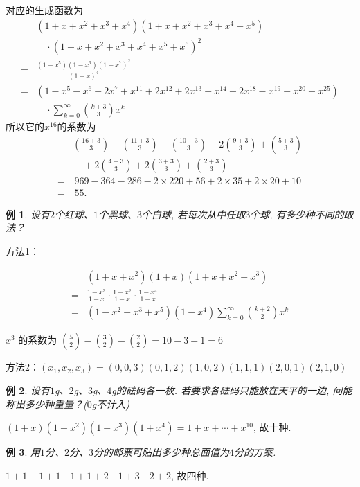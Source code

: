 \documentclass[punct]{ctexbeamer}
\newtheorem{ex}{例}[section]
\def\sol{\noindent {\bf 解\ }}
\begin{document}
\begin{frame}
	对应的生成函数为
	$$
	\begin{aligned}
	&(1+x+x^2+x^3+x^4)
	(1+x+x^2+x^3+x^4+x^5)\\
	&\quad\cdot 	(1+x+x^2+x^3+x^4+x^5+x^6)^2\\
	= & \frac{(1-x^5)(1-x^6)(1-x^7)^2}{(1-x)^4}\\
	= &
	(1 - x^5 - x^6 - 2 x^7 + x^{11} + 2 x^{12} + 2 x^{13} + x^{14} -
	2 x^{18} - x^{19} - x^{20} + x^{25})\\
	&\quad\cdot \sum_{k=0}^{\infty} \binom{k+3}{3} x^k
	\end{aligned}$$
	所以它的$x^{16}$的系数为
	$$
	\begin{aligned}
	& \binom{16+3}{3}
	-\binom{11+3}{3}
	-\binom{10+3}{3}
	-2\binom{9+3}{3}
	+ \binom{5+3}{3}\\
	&\quad
	+2\binom{4+3}{3}
	+2\binom{3+3}{3}
	+\binom{2+3}{3} \\
	= & \,969 -  364 - 286 -2 \times 220 + 56  +2 \times 35 +2 \times 20 + 10 \\
	= & \,55.
	\end{aligned}$$
\end{frame}

\begin{frame}
	\begin{ex}
		设有$2$个红球、$1$个黑球、$3$个白球, 若每次从中任取$3$个球, 有多少种不同的取法？
	\end{ex}
\pause\sol
方法1：

$$\begin{aligned}&\left(1+x+x^{2}\right)(1+x)\left(1+x+x^{2}+x^{3}\right)\\
 =&\frac{1-x^{3}}{1-x} \cdot \frac{1-x^{2}}{1-x} \cdot \frac{1-x^{4}}{1-x} \\ =&\left(1-x^{2}-x^{3}+x^{5}\right)\left(1-x^{4}\right) \sum_{k=0}^{\infty}\binom{k+2}{2} x^{k} \end{aligned}$$

$x^{3}$ 的系数为 $\binom{5}{2}-\binom{3}{2}-\binom{2}{2}=10-3-1=6$

方法2：$\left(x_{1}, x_{2}, x_{3}\right)=(0,0,3)(0, 1, 2)(1,0,2)(1,1,1)(2,0,1)(2,1,0)$
\end{frame}

\begin{frame}
	\begin{ex}
		设有$1$g、$2$g、$3$g、$4$g的砝码各一枚. 若要求各砝码只能放在天平的一边, 问能称出多少种重量？($0$g不计入)
	\end{ex}
\pause\sol $(1+x)\left(1+x^{2}\right)\left(1+x^{3}\right)\left(1+x^{4}\right)=1+x+\cdots+x^{10}$, 故十种.
\pause
\begin{ex}
	用$1$分、$2$分、$3$分的邮票可贴出多少种总面值为$4$分的方案.
\end{ex}
\pause
\sol $1+1+1+1 \quad 1+1+2 \quad 1+3 \quad 2+2$, 故四种.
\end{frame}
\end{document}
